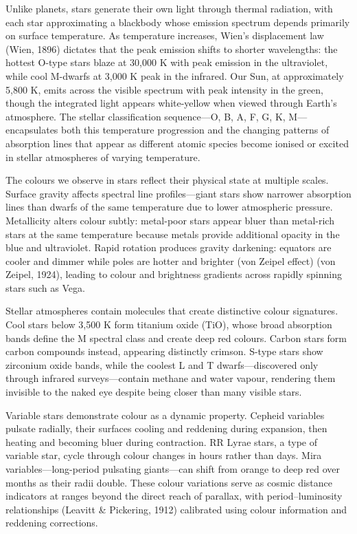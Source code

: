 Unlike planets, stars generate their own light through thermal radiation, with each star approximating a blackbody whose emission spectrum depends primarily on surface temperature. As temperature increases, Wien's displacement law (Wien, 1896) dictates that the peak emission shifts to shorter wavelengths: the hottest O-type stars blaze at 30,000 K with peak emission in the ultraviolet, while cool M-dwarfs at 3,000 K peak in the infrared. Our Sun, at approximately 5,800 K, emits across the visible spectrum with peak intensity in the green, though the integrated light appears white-yellow when viewed through Earth's atmosphere. The stellar classification sequence—O, B, A, F, G, K, M—encapsulates both this temperature progression and the changing patterns of absorption lines that appear as different atomic species become ionised or excited in stellar atmospheres of varying temperature.

The colours we observe in stars reflect their physical state at multiple scales. Surface gravity affects spectral line profiles—giant stars show narrower absorption lines than dwarfs of the same temperature due to lower atmospheric pressure. Metallicity alters colour subtly: metal-poor stars appear bluer than metal-rich stars at the same temperature because metals provide additional opacity in the blue and ultraviolet. Rapid rotation produces gravity darkening: equators are cooler and dimmer while poles are hotter and brighter (von Zeipel effect) (von Zeipel, 1924), leading to colour and brightness gradients across rapidly spinning stars such as Vega.

Stellar atmospheres contain molecules that create distinctive colour signatures. Cool stars below 3,500 K form titanium oxide (TiO), whose broad absorption bands define the M spectral class and create deep red colours. Carbon stars form carbon compounds instead, appearing distinctly crimson. S-type stars show zirconium oxide bands, while the coolest L and T dwarfs—discovered only through infrared surveys—contain methane and water vapour, rendering them invisible to the naked eye despite being closer than many visible stars.

Variable stars demonstrate colour as a dynamic property. Cepheid variables pulsate radially, their surfaces cooling and reddening during expansion, then heating and becoming bluer during contraction. RR Lyrae stars, a type of variable star, cycle through colour changes in hours rather than days. Mira variables—long-period pulsating giants—can shift from orange to deep red over months as their radii double. These colour variations serve as cosmic distance indicators at ranges beyond the direct reach of parallax, with period–luminosity relationships (Leavitt \& Pickering, 1912) calibrated using colour information and reddening corrections.

